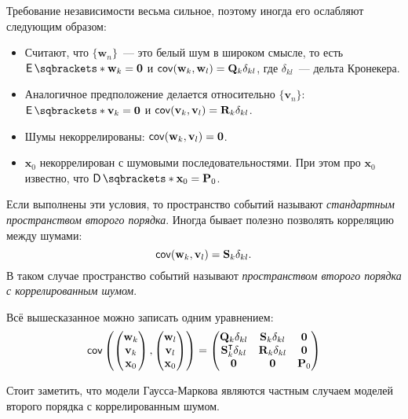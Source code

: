 Требование независимости весьма сильное, поэтому иногда его ослабляют следующим 
образом:
\begin{itemize}
	\item Считают, что \(\{\mathbf{w}_{n}\}\)~--- это белый шум в широком 
	смысле, то есть \(\E{\mathbf{w}_{k}} = \mathbf{0}\) и 
	\(\operatorname{\mathsf{cov}}(\mathbf{w}_{k}, \mathbf{w}_{l}) = \mathbf{Q}_{k}\delta_{kl}\), где 
	\(\delta_{kl}\)~--- дельта Кронекера.
	\item Аналогичное предположение делается относительно 
	\(\{\mathbf{v}_{n}\}\): \(\E{\mathbf{v}_{k}} = \mathbf{0}\) и 
	\(\operatorname{\mathsf{cov}}(\mathbf{v}_{k}, \mathbf{v}_{l}) = \mathbf{R}_{k}\delta_{kl}\).
	\item Шумы некоррелированы: \(\operatorname{\mathsf{cov}}(\mathbf{w}_{k}, \mathbf{v}_{l}) = 
	\mathbf{0}\).
	\item \(\mathbf{x}_{0}\) некоррелирован с шумовыми последовательностями. 
	При этом про \(\mathbf{x}_{0}\) известно, что \(\D{\mathbf{x}_{0}} = 
	\mathbf{P}_{0}\).
\end{itemize}

Если выполнены эти условия, то пространство событий называют 
\emph{стандартным пространством второго порядка}. Иногда бывает полезно 
позволять корреляцию между шумами:
\[
	\operatorname{\mathsf{cov}}(\mathbf{w}_{k}, \mathbf{v}_{l}) = \mathbf{S}_{k}\delta_{kl}.
\] 
В таком случае пространство событий называют \emph{пространством второго 
порядка с коррелированным шумом}. 

Всё вышесказанное можно записать одним уравнением:
\[
	\operatorname{\mathsf{cov}}\left(
	\begin{pmatrix}
	\mathbf{w}_{k} \\ \mathbf{v}_{k} \\ \mathbf{x}_{0}
	\end{pmatrix}
	,
	\begin{pmatrix}
	\mathbf{w}_{l} \\ \mathbf{v}_{l} \\ \mathbf{x}_{0}
	\end{pmatrix}
	\right)
	=
	\begin{pmatrix}
	\mathbf{Q}_{k}\delta_{kl} & \mathbf{S}_{k}\delta_{kl} & \mathbf{0} \\
	\mathbf{S}_{k}^{\intercal}\delta_{kl} & \mathbf{R}_{k}\delta_{kl} & 
	\mathbf{0} \\
	\mathbf{0} & \mathbf{0} & \mathbf{P}_{0}
	\end{pmatrix}
\]

Стоит заметить, что модели Гаусса-Маркова являются частным случаем моделей 
второго порядка с коррелированным шумом.

